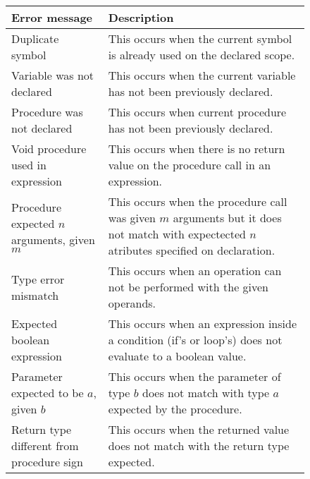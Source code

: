 \begin{figure}[h]
    \centering
    \begin{tabular}{p{1.5in}p{2.5in}}
        \toprule
        \textbf{Error message} & \textbf{Description}\\

        \midrule Duplicate symbol &
        This occurs when the current symbol is already used on the declared
        scope.\\

        \midrule Variable was not \newline declared &
        This occurs when the current variable has not been \newline previously
        declared.\\

        \midrule Procedure was not \newline declared &
        This occurs when current procedure has not been \newline previously
        declared.\\

        \midrule Void procedure used \newline in expression &
        This occurs when there is no return value on the procedure call in
        an expression.\\

        \midrule Procedure expected $n$ \newline arguments, given $m$ &
        This occurs when the procedure call was given $m$ arguments but it
        does not match with expectected $n$ atributes specified on declaration.\\

        \midrule Type error mismatch &
        This occurs when an operation can not be performed with the given
        operands.\\

        \midrule Expected boolean \newline expression &
        This occurs when an expression inside a condition (if's or loop's) does
        not evaluate to a boolean value.\\

        \midrule Parameter expected \newline to be $a$, given $b$ &
        This occurs when the parameter of type $b$ does not match with type $a$
        expected by the procedure.\\

        \midrule Return type \newline different from \newline procedure sign &
        This occurs when the returned value does not match with the return
        type expected.\\


\end{tabular}
\end{figure}
